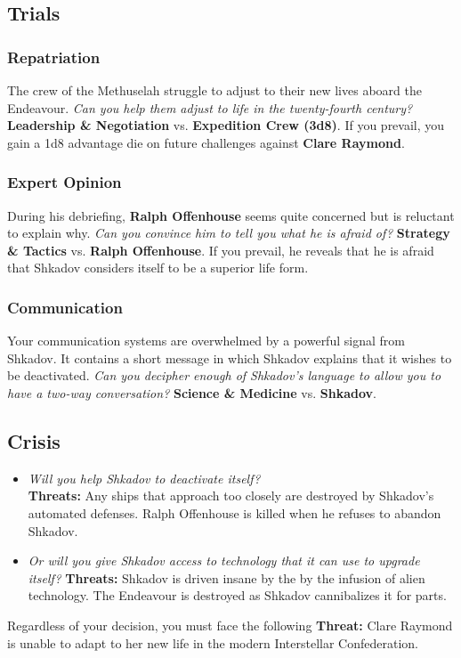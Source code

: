 \documentclass[11pt, a5paper, parskip=half-, DIV=12]{scrartcl}
\begin{document}
\subsection*{Trials}
\subsubsection*{Repatriation}
The crew of the Methuselah struggle to adjust to their new lives aboard the Endeavour. \textit{Can you help them adjust to life in the twenty-fourth century?} \textbf{Leadership \& Negotiation} vs. \textbf{Expedition Crew (3d8)}. If you prevail, you gain a 1d8 advantage die on future challenges against \textbf{Clare Raymond}.

\subsubsection*{Expert Opinion}
During his debriefing, \textbf{Ralph Offenhouse} seems quite concerned but is reluctant to explain why. \textit{Can you convince him to tell you what he is afraid of?} \textbf{Strategy \& Tactics} vs. \textbf{Ralph Offenhouse}. If you prevail, he reveals that he is afraid that Shkadov considers itself to be a superior life form.

\subsubsection*{Communication}
Your communication systems are overwhelmed by a powerful signal from Shkadov. It contains a short message in which Shkadov explains that it wishes to be deactivated. \textit{Can you decipher enough of Shkadov's language to allow you to have a two-way conversation?} \textbf{Science \& Medicine} vs. \textbf{Shkadov}.

\subsection*{Crisis}

\begin{itemize}
	\item \textit{Will you help Shkadov to deactivate itself?} \\ \textbf{Threats:}  Any ships that approach too closely are destroyed by Shkadov's automated defenses. Ralph Offenhouse is killed when he refuses to abandon Shkadov.
	\item \textit{Or will you give Shkadov access to technology that it can use to upgrade itself?} \textbf{Threats:} Shkadov is driven insane by the by the infusion of alien technology. The Endeavour is destroyed as Shkadov cannibalizes it for parts.
\end{itemize}
Regardless of your decision, you must face the following \textbf{Threat:} Clare Raymond is unable to adapt to her new life in the modern Interstellar Confederation.
\end{document}

